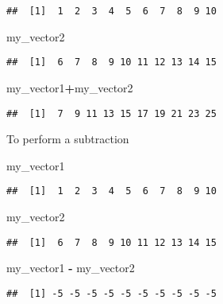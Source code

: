 \documentclass[
]{article}
\newenvironment{Shaded}{\begin{snugshade}}{\end{snugshade}}
\newcommand{\NormalTok}[1]{#1}
\newcommand{\SpecialCharTok}[1]{\textcolor[rgb]{0.81,0.36,0.00}{\textbf{#1}}}
\begin{document}
\begin{verbatim}
##  [1]  1  2  3  4  5  6  7  8  9 10
\end{verbatim}

\begin{Shaded}
\begin{Highlighting}[]
\NormalTok{my\_vector2}
\end{Highlighting}
\end{Shaded}

\begin{verbatim}
##  [1]  6  7  8  9 10 11 12 13 14 15
\end{verbatim}

\begin{Shaded}
\begin{Highlighting}[]
\NormalTok{my\_vector1}\SpecialCharTok{+}\NormalTok{my\_vector2}
\end{Highlighting}
\end{Shaded}

\begin{verbatim}
##  [1]  7  9 11 13 15 17 19 21 23 25
\end{verbatim}

To perform a subtraction

\begin{Shaded}
\begin{Highlighting}[]
\NormalTok{my\_vector1}
\end{Highlighting}
\end{Shaded}

\begin{verbatim}
##  [1]  1  2  3  4  5  6  7  8  9 10
\end{verbatim}

\begin{Shaded}
\begin{Highlighting}[]
\NormalTok{my\_vector2}
\end{Highlighting}
\end{Shaded}

\begin{verbatim}
##  [1]  6  7  8  9 10 11 12 13 14 15
\end{verbatim}

\begin{Shaded}
\begin{Highlighting}[]
\NormalTok{my\_vector1 }\SpecialCharTok{{-}}\NormalTok{ my\_vector2}
\end{Highlighting}
\end{Shaded}

\begin{verbatim}
##  [1] -5 -5 -5 -5 -5 -5 -5 -5 -5 -5
\end{verbatim}
\end{document}
